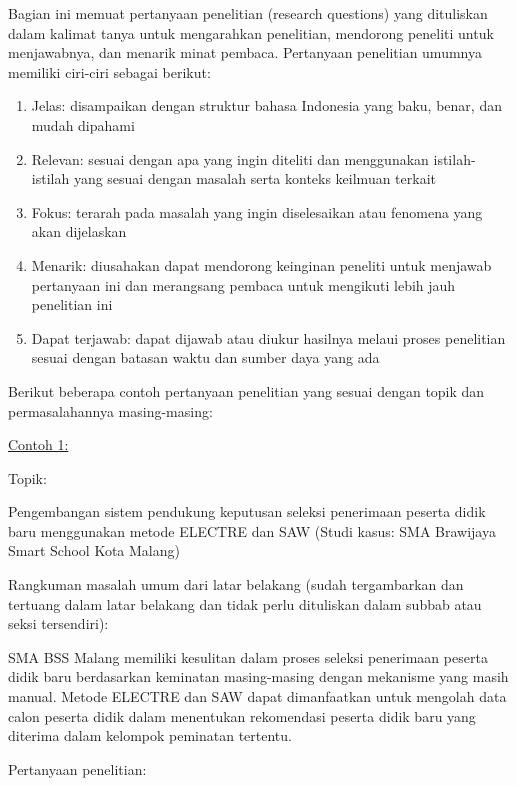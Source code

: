 Bagian ini memuat pertanyaan penelitian (research questions) yang dituliskan dalam kalimat tanya untuk mengarahkan penelitian, mendorong peneliti untuk menjawabnya, dan menarik minat pembaca. Pertanyaan penelitian umumnya memiliki ciri-ciri sebagai berikut:

\begin{enumerate}
  \item Jelas: disampaikan dengan struktur bahasa Indonesia yang baku, benar, dan mudah dipahami
  \item Relevan: sesuai dengan apa yang ingin diteliti dan menggunakan istilah-istilah yang sesuai dengan masalah serta konteks keilmuan terkait
  \item Fokus: terarah pada masalah yang ingin diselesaikan atau fenomena yang akan dijelaskan
  \item Menarik: diusahakan dapat mendorong keinginan peneliti untuk menjawab pertanyaan ini dan merangsang pembaca untuk mengikuti lebih jauh penelitian ini
  \item Dapat terjawab: dapat dijawab atau diukur hasilnya melaui proses penelitian sesuai dengan batasan waktu dan sumber daya yang ada 
\end{enumerate}


Berikut beberapa contoh pertanyaan penelitian yang sesuai dengan topik dan permasalahannya masing-masing:

\noindent\underline{Contoh 1:}

\noindent Topik: 

\begin{displayquote}
Pengembangan sistem pendukung keputusan seleksi penerimaan peserta didik baru menggunakan metode ELECTRE dan SAW (Studi kasus: SMA Brawijaya Smart School Kota Malang)
\end{displayquote}

Rangkuman masalah umum dari latar belakang (sudah tergambarkan dan tertuang dalam latar belakang dan tidak perlu dituliskan dalam subbab atau seksi tersendiri):

\begin{displayquote}
SMA BSS Malang memiliki kesulitan dalam proses seleksi penerimaan peserta didik baru berdasarkan keminatan masing-masing dengan mekanisme yang masih manual. Metode ELECTRE dan SAW dapat dimanfaatkan untuk mengolah data calon peserta didik dalam menentukan rekomendasi peserta didik baru yang diterima dalam kelompok peminatan tertentu.
\end{displayquote}

\noindent Pertanyaan penelitian:

